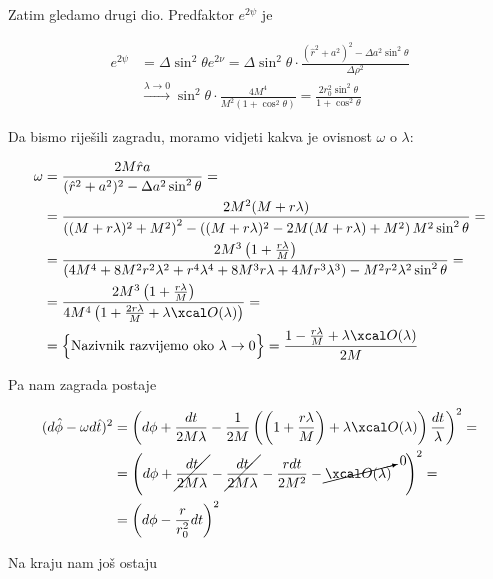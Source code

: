 \noindent Zatim gledamo drugi dio. Predfaktor $e^{2\psi}$ je

\begin{equation}
\begin{split}
e^{2\psi}&=\Delta\sin^2\theta e^{2\nu}=\Delta \sin^2\theta\cdot\frac{(\hat{r}^2+a^2)^2-\Delta a^2\sin^2\theta}{\Delta\rho^2}\\
&\xrightarrow{\lambda\to 0}\sin^2\theta\cdot\frac{4M^4}{M^2(1+\cos^2\theta)}=\frac{2r_0^2\sin^2\theta}{1+\cos^2\theta}
\end{split}
\end{equation}

\noindent Da bismo riješili zagradu, moramo vidjeti kakva je ovisnost $\omega$ o $\lambda$:

\begin{equation}
\begin{split}
\omega&=\frac{2M\hat{r}a}{(\hat{r}^2+a^2)^2-\Delta a^2\sin^2\theta}=\\
&=\frac{2M^2(M+r\lambda)}{\left((M+r\lambda)^2+M^2\right)^2-\left((M+r\lambda)^2-2M(M+r\lambda)+M^2\right)M^2\sin^2\theta}=\\
&=\frac{2M^3\left(1+\frac{r\lambda}{M}\right)}{\left(4M^4+8M^2r^2\lambda^2+r^4\lambda^4+8M^3r\lambda+4Mr^3\lambda^3\right)-M^2r^2\lambda^2\sin^2\theta}=\\
&=\frac{2M^3\left(1+\frac{r\lambda}{M}\right)}{4M^4\left(1+\frac{2r\lambda}{M}+\lambda\bigo(\lambda)\right)}=\\
&=\Big\{\textrm{Nazivnik razvijemo oko}\ \lambda\to 0\Big\}=\frac{1-\frac{r\lambda}{M}+\lambda\bigo(\lambda)}{2M}
\end{split}
\end{equation}

\noindent Pa nam zagrada postaje

\begin{equation}
\begin{split}
(d\hat{\phi}-\omega d\hat{t})^2&=\left(d\phi+\frac{dt}{2M\lambda}-\frac{1}{2M}\left(\left(1+\frac{r\lambda}{M}\right)+\lambda\bigo(\lambda)\right)\frac{dt}{\lambda} \right)^2=\\
&=\left(d\phi+\cancel{\frac{dt}{2M\lambda}}-\cancel{\frac{dt}{2M\lambda}}-\frac{r dt}{2M^2}-\cancelto{0}{\bigo(\lambda)}\hspace*{1em} \right)^2=\\
&=\left(d\phi-\frac{r}{r_0^2}dt\right)^2
\end{split}
\end{equation}

\noindent Na kraju nam još ostaju

